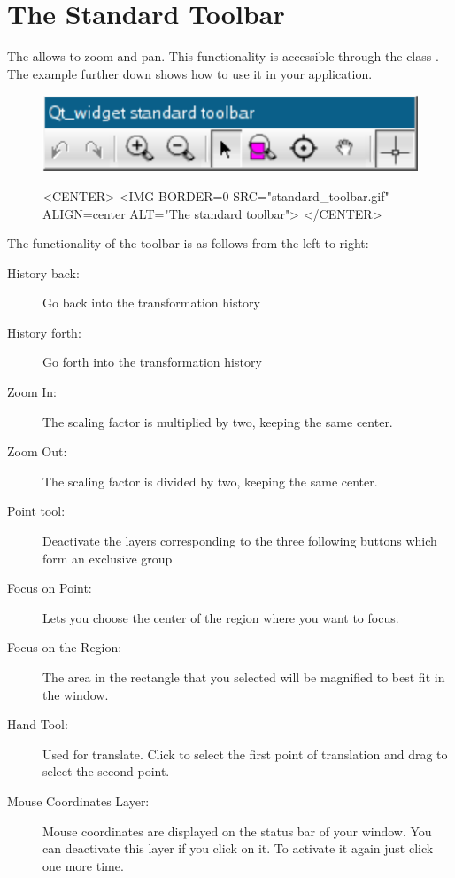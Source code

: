 \section{The Standard Toolbar}
\label{Qt_widget_standard_toolbar}

The  allows to zoom and pan. This functionality is 
accessible through the class . The 
example further down shows how to use it in your application.

\begin{figure}[h]
\begin{ccTexOnly}
\begin{center}
\includegraphics{Qt_widget/standard_toolbar} 
\end{center}
\end{ccTexOnly}
\begin{ccHtmlOnly}
<CENTER>
<IMG BORDER=0 SRC="standard_toolbar.gif"  ALIGN=center  ALT="The
standard toolbar">
</CENTER>
\end{ccHtmlOnly}
\end{figure}

The functionality of the toolbar is as follows from the left to right:
\begin{description}
         \item[History back:] Go back into the transformation history
        \item[History forth:] Go forth into the transformation history
        \item[Zoom In:] The scaling factor is multiplied by two,
keeping the same center.
        \item[Zoom Out:] The scaling factor is divided by two, keeping
the same center.
       \item[Point tool:] Deactivate the layers corresponding to the
three following buttons which form an exclusive group
        \item[Focus on Point:] Lets you choose the center of the
region where you want to focus.
        \item[Focus on the Region:] The area in the rectangle that you selected will be magnified to best fit in the window.
        \item[Hand Tool:] Used for translate. Click to select the
first point of translation and drag to select the second point.
        \item[Mouse Coordinates Layer:] Mouse coordinates are
displayed on the status bar of your window.  You can deactivate this
layer if you click on it. To activate it again just click one more time.
\end{description}



